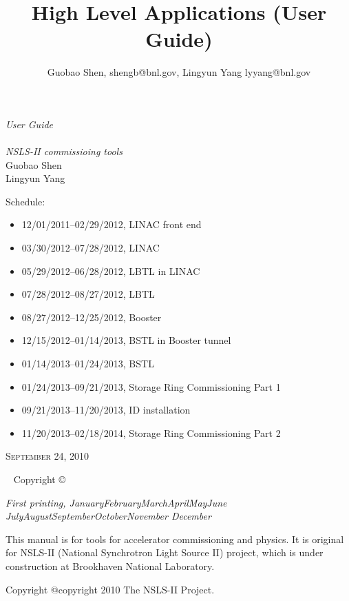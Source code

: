 \documentclass[11pt,oneside,letterpaper,showtrims,article]{memoir}
\title{High Level Applications (User Guide)}
\author{Guobao Shen, shengb@bnl.gov, Lingyun Yang lyyang@bnl.gov}
\newcommand{\monthyear}{%
  \ifcase\month\or January\or February\or March\or April\or May\or June\or
  July\or August\or September\or October\or November\or
  December\fi\space\number\year
}
\begin{document}
\begin{titlingpage}
{\begingroup%
\raggedleft
\vspace*{\baselineskip}
{\Huge\itshape User Guide} \\
\vspace*{\baselineskip}{\Huge\itshape of High Level Applications}\\[\baselineskip]
{\large\itshape NSLS-II commissioing tools}\\[0.2\textheight]
{\Large Guobao Shen\\Lingyun Yang}\par
\vfill
\flushleft
{\sffamily
  Schedule:\hfill
\begin{itemize}
\item 12/01/2011--02/29/2012, LINAC front end
\item 03/30/2012--07/28/2012, LINAC
\item 05/29/2012--06/28/2012, LBTL in LINAC
\item 07/28/2012--08/27/2012, LBTL
\item 08/27/2012--12/25/2012, Booster
\item 12/15/2012--01/14/2013, BSTL in Booster tunnel
\item 01/14/2013--01/24/2013, BSTL
\item 01/24/2013--09/21/2013, Storage Ring Commissioning Part 1
\item 09/21/2013--11/20/2013, ID installation
\item 11/20/2013--02/18/2014, Storage Ring Commissioning Part 2
\end{itemize}
}
\vspace*{5ex}
{\small\scshape September 24, 2010}
\vspace*{\baselineskip}
\endgroup}
\end{titlingpage}


\newpage
~\vfill
\thispagestyle{empty}
\setlength{\parindent}{0pt}
\setlength{\parskip}{\baselineskip}
Copyright \copyright\ %

\par\textit{First printing, \monthyear}

This manual is for tools for accelerator commissioning and physics. It
is original for NSLS-II (National Synchrotron Light Source II)
project, which is under construction at Brookhaven National
Laboratory. 

Copyright @copyright{} 2010 The NSLS-II Project.
\end{document}
